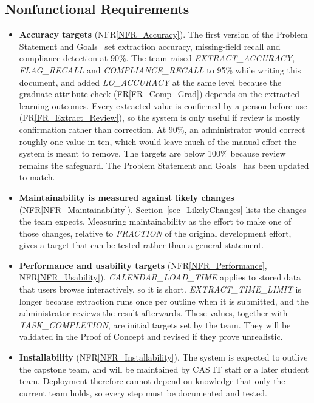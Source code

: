 \documentclass[12pt]{article}
\newcommand{\rref}[1]{FR\ref{#1}}
\newcommand{\nfrref}[1]{NFR\ref{#1}}
\begin{document}
\subsection{Nonfunctional Requirements}

\begin{itemize}
\item \textbf{Accuracy targets} (\nfrref{NFR_Accuracy}). The first version
  of the Problem Statement and Goals~\citep{TeamBVSH2026PS} set extraction accuracy, missing-field recall and
  compliance detection at 90\%. The team raised
  \textit{EXTRACT\_\allowbreak{}ACCURACY}, \textit{FLAG\_\allowbreak{}RECALL}
  and \textit{COMPLIANCE\_\allowbreak{}RECALL} to 95\% while writing this
  document, and added \textit{LO\_\allowbreak{}ACCURACY} at the same level
  because the graduate attribute check (\rref{FR_Comp_Grad}) depends on the
  extracted learning outcomes. Every extracted value is confirmed by a person before use
  (\rref{FR_Extract_Review}), so the system is only useful if review is mostly
  confirmation rather than correction. At 90\%, an administrator would correct
  roughly one value in ten, which would leave much of the manual effort the
  system is meant to remove. The targets are below 100\% because review remains
  the safeguard. The Problem Statement and Goals~\citep{TeamBVSH2026PS} has been updated to match.

\item \textbf{Maintainability is measured against likely changes}
  (\nfrref{NFR_Maintainability}). Section~\ref{sec_LikelyChanges} lists the
  changes the team expects. Measuring maintainability as the effort to make one
  of those changes, relative to \textit{FRACTION} of the original development
  effort, gives a target that can be tested rather than a general statement.

\item \textbf{Performance and usability targets} (\nfrref{NFR_Performance},
  \nfrref{NFR_Usability}). \textit{CALENDAR\_\allowbreak{}LOAD\_\allowbreak{}TIME}
  applies to stored data that users browse interactively, so it is short.
  \textit{EXTRACT\_\allowbreak{}TIME\_\allowbreak{}LIMIT} is longer because
  extraction runs once per outline when it is submitted, and the administrator
  reviews the result afterwards. These values, together with
  \textit{TASK\_\allowbreak{}COMPLETION}, are initial targets set by the team.
  They will be validated in the Proof of Concept and revised if they prove
  unrealistic.

\item \textbf{Installability} (\nfrref{NFR_Installability}). The system is
  expected to outlive the capstone team, and will be maintained by CAS IT staff
  or a later student team. Deployment therefore cannot depend on knowledge that
  only the current team holds, so every step must be documented and tested.


\end{itemize}
\end{document}

